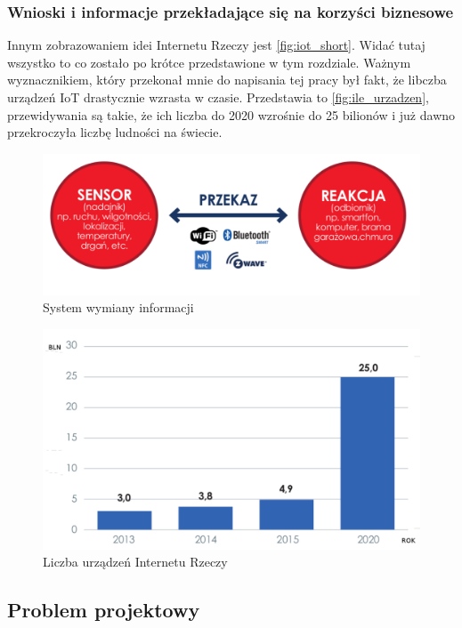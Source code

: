 \subsubsection{Wnioski i informacje przekładające się na korzyści biznesowe}
\label{sec:benefits_conclusions}
Innym zobrazowaniem idei Internetu Rzeczy jest \autoref{fig:iot_short}. Widać tutaj wszystko to co zostało po krótce przedstawione w tym rozdziale. 
Ważnym wyznacznikiem, który przekonał mnie do napisania tej pracy był fakt, że libczba urządzeń IoT drastycznie wzrasta w czasie. Przedstawia to \autoref{fig:ile_urzadzen}, przewidywania są takie, że ich liczba do 2020 wzrośnie do 25 bilionów i już dawno przekroczyła liczbę ludności na świecie.  
\begin{figure}[!htbp]
	\centering
	\includegraphics[width=1.0\textwidth]{images/iot_short.png}
	\caption[System wymiany informacji.]{System wymiany informacji}
	\label{fig:iot_short}
\end{figure}
\begin{figure}[!htbp]
	\centering
	\includegraphics[width=1.0\textwidth]{images/ile_urzadzen.png}
	\caption[Liczba urządzeń Internetu Rzeczy.]{Liczba urządzeń Internetu Rzeczy}
	\label{fig:ile_urzadzen}
\end{figure}


\subsection{Problem projektowy}

